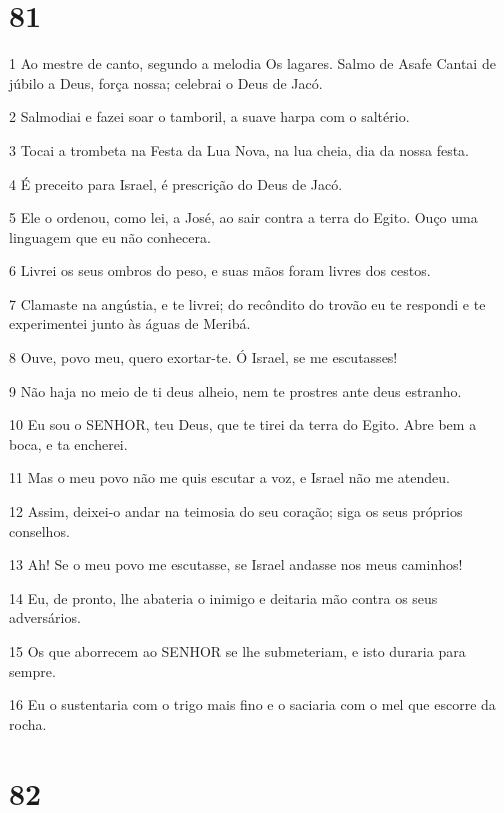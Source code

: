 \chapter{81}

\par 1 Ao mestre de canto, segundo a melodia Os lagares. Salmo de Asafe Cantai de júbilo a Deus, força nossa; celebrai o Deus de Jacó.
\par 2 Salmodiai e fazei soar o tamboril, a suave harpa com o saltério.
\par 3 Tocai a trombeta na Festa da Lua Nova, na lua cheia, dia da nossa festa.
\par 4 É preceito para Israel, é prescrição do Deus de Jacó.
\par 5 Ele o ordenou, como lei, a José, ao sair contra a terra do Egito. Ouço uma linguagem que eu não conhecera.
\par 6 Livrei os seus ombros do peso, e suas mãos foram livres dos cestos.
\par 7 Clamaste na angústia, e te livrei; do recôndito do trovão eu te respondi e te experimentei junto às águas de Meribá.
\par 8 Ouve, povo meu, quero exortar-te. Ó Israel, se me escutasses!
\par 9 Não haja no meio de ti deus alheio, nem te prostres ante deus estranho.
\par 10 Eu sou o SENHOR, teu Deus, que te tirei da terra do Egito. Abre bem a boca, e ta encherei.
\par 11 Mas o meu povo não me quis escutar a voz, e Israel não me atendeu.
\par 12 Assim, deixei-o andar na teimosia do seu coração; siga os seus próprios conselhos.
\par 13 Ah! Se o meu povo me escutasse, se Israel andasse nos meus caminhos!
\par 14 Eu, de pronto, lhe abateria o inimigo e deitaria mão contra os seus adversários.
\par 15 Os que aborrecem ao SENHOR se lhe submeteriam, e isto duraria para sempre.
\par 16 Eu o sustentaria com o trigo mais fino e o saciaria com o mel que escorre da rocha.

\chapter{82}

